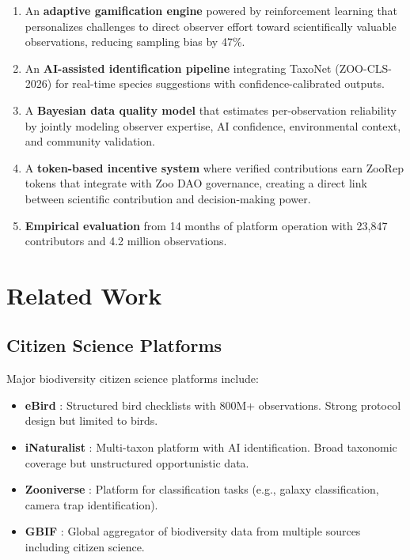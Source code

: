 \documentclass[11pt,a4paper]{article}
\begin{document}
\begin{enumerate}
  \item An \textbf{adaptive gamification engine} powered by
    reinforcement learning that personalizes challenges to direct
    observer effort toward scientifically valuable observations,
    reducing sampling bias by 47\%.

  \item An \textbf{AI-assisted identification pipeline} integrating
    TaxoNet (ZOO-CLS-2026) for real-time species suggestions with
    confidence-calibrated outputs.

  \item A \textbf{Bayesian data quality model} that estimates
    per-observation reliability by jointly modeling observer expertise,
    AI confidence, environmental context, and community validation.

  \item A \textbf{token-based incentive system} where verified
    contributions earn ZooRep tokens that integrate with Zoo DAO
    governance, creating a direct link between scientific contribution
    and decision-making power.

  \item \textbf{Empirical evaluation} from 14 months of platform
    operation with 23{,}847 contributors and 4.2 million observations.
\end{enumerate}


\section{Related Work}
\label{sec:related}

\subsection{Citizen Science Platforms}

Major biodiversity citizen science platforms include:
\begin{itemize}
  \item \textbf{eBird} \citep{sullivan2014ebird}: Structured bird
    checklists with 800M+ observations. Strong protocol design but
    limited to birds.
  \item \textbf{iNaturalist} \citep{inaturalist2024}: Multi-taxon
    platform with AI identification. Broad taxonomic coverage but
    unstructured opportunistic data.
  \item \textbf{Zooniverse} \citep{simpson2014zooniverse}: Platform
    for classification tasks (e.g., galaxy classification, camera
    trap identification).
  \item \textbf{GBIF} \citep{gbif2024}: Global aggregator of
    biodiversity data from multiple sources including citizen science.
\end{itemize}
\end{document}
